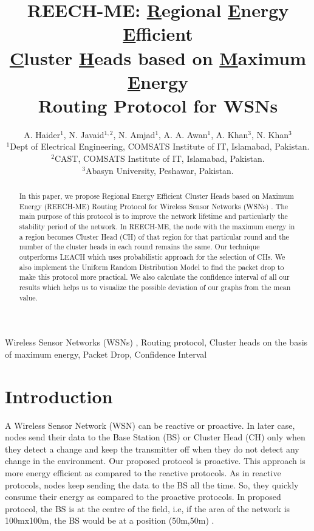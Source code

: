 \documentclass[journal]{IEEEtran}
\begin{document}
\title{REECH-ME: \underline{R}egional \underline{E}nergy \underline{E}fficient\\ \underline{C}luster \underline{H}eads based on \underline{M}aximum \underline{E}nergy\\ Routing Protocol for WSNs}

\author{A. Haider$^{1}$, N. Javaid$^{1,2}$, N. Amjad$^{1}$, A. A. Awan$^{1}$, A. Khan$^{3}$, N. Khan$^{3}$\\\vspace{0.4cm}
$^{1}$Dept of Electrical Engineering, COMSATS Institute of IT, Islamabad, Pakistan.\\
$^{2}$CAST, COMSATS Institute of IT, Islamabad, Pakistan.\\
$^{3}$Abasyn University, Peshawar, Pakistan.}
\maketitle

\begin{abstract}
\boldmath
In this paper, we propose Regional Energy Efficient Cluster Heads based on Maximum Energy (REECH-ME) Routing Protocol for Wireless Sensor Networks (WSNs) . The main purpose of this protocol is to improve the network lifetime and particularly the stability period of the network. In REECH-ME, the node with the maximum energy in a region becomes Cluster Head (CH) of that region for that particular round and the number of the cluster heads in each round remains the same. Our technique outperforms LEACH which uses probabilistic approach for the selection of CHs. We also implement the Uniform Random Distribution Model to find the packet drop to make this protocol more practical. We also calculate the confidence interval of all our results which helps us to visualize the possible deviation of our graphs from the mean value.

\end{abstract}
\begin{IEEEkeywords}
Wireless Sensor Networks (WSNs) , Routing protocol, Cluster heads on the basis of maximum energy, Packet Drop, Confidence Interval
\end{IEEEkeywords}

\section{Introduction}

A Wireless Sensor Network (WSN) can be reactive or proactive. In later case, nodes send their data to the Base Station (BS) or Cluster Head (CH) only when they detect a change and keep the transmitter off when they do not detect any change in the environment. Our proposed protocol is proactive. This approach is more energy efficient as compared to the reactive protocols. As in reactive protocols, nodes keep sending the data to the BS all the time. So, they quickly consume their energy as compared to the proactive protocols. In proposed protocol, the BS is at the centre of the field, i.e, if the area of the network is 100mx100m, the BS would be at a position (50m,50m) .
\end{document}
